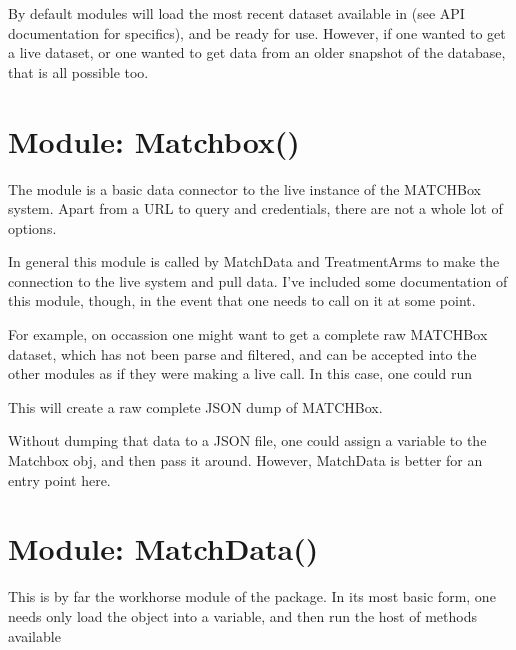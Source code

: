 \documentclass[letterpaper,10pt,english]{sphinxmanual}
\begin{document}
By default modules will load the most recent dataset available in
 (see API documentation for specifics), and be ready for use.
However, if one wanted to get a live dataset, or one wanted to get data from an
older snapshot of the database, that is all possible too.


\section{Module: Matchbox()}
\label{\detokenize{tutorial:module-matchbox}}
The  module is a basic data connector to the live instance of the
MATCHBox system.  Apart from a URL to query and credentials, there are not a
whole lot of options.

In general this module is called by MatchData and TreatmentArms to make the
connection to the live system and pull data.  I’ve included some documentation of
this module, though, in the event that one needs to call on it at some point.

For example, on occassion one might want to get a complete raw MATCHBox dataset,
which has not been parse and filtered, and can be accepted into the other modules
as if they were making a live call.  In this case, one could run

%
\begin{sphinxVerbatim}[commandchars=\\\{\}]
   
\end{sphinxVerbatim}

This will create a raw complete JSON dump of MATCHBox.

Without dumping that data to a JSON file, one could assign a variable to the
Matchbox obj, and then pass it around.  However, MatchData is better for an
entry point here.


\section{Module: MatchData()}
\label{\detokenize{tutorial:module-matchdata}}
This is by far the workhorse module of the package.  In its most basic form, one
needs only load the object into a variable, and then run the host of methods
available
\end{document}
